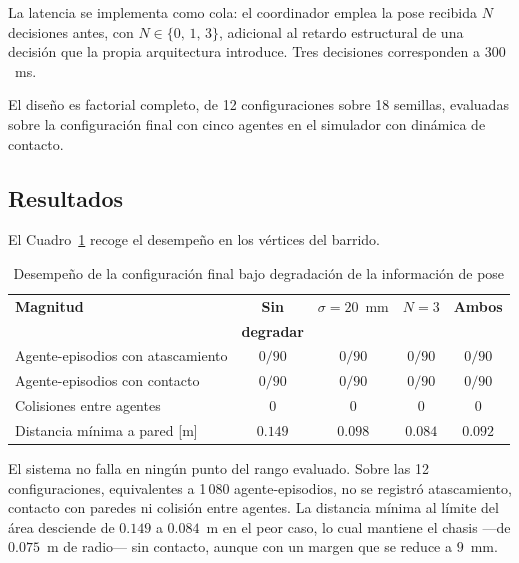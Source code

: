 La latencia se implementa como cola: el coordinador emplea la pose recibida
$N$ decisiones antes, con $N \in \{0,\, 1,\, 3\}$, adicional al retardo
estructural de una decisión que la propia arquitectura introduce. Tres
decisiones corresponden a $300$~ms.

El diseño es factorial completo, de 12 configuraciones sobre 18 semillas, evaluadas sobre la configuración final con cinco agentes en el
simulador con dinámica de contacto.

\subsection*{Resultados}

El Cuadro~\ref{tab:robustez} recoge el desempeño en los vértices del barrido.

\begin{table}[h]
    \centering\captionsetup{width=0.9\linewidth}
    \caption{Desempeño de la configuración final bajo degradación de la
             información de pose}
    \begin{tabular}{lcccc}
        \textbf{Magnitud} & \textbf{Sin} & $\sigma = 20$~mm &
        $N = 3$ & \textbf{Ambos} \\
        & \textbf{degradar} & & & \\
        \hline
        Agente-episodios con atascamiento & $0/90$ & $0/90$ & $0/90$
            & $0/90$ \\
        Agente-episodios con contacto & $0/90$ & $0/90$ & $0/90$ & $0/90$ \\
        Colisiones entre agentes & $0$ & $0$ & $0$ & $0$ \\
        Distancia mínima a pared [m] & $0{.}149$ & $0{.}098$ & $0{.}084$
            & $0{.}092$ \\
    \end{tabular}
    \label{tab:robustez}
\end{table}

El sistema no falla en ningún punto del rango evaluado. Sobre las 12 configuraciones, equivalentes a 1\,080 agente-episodios, no se registró
atascamiento, contacto con paredes ni colisión entre agentes. La distancia
mínima al límite del área desciende de $0{.}149$ a $0{.}084$~m en el peor caso,
lo cual mantiene el chasis —de $0{.}075$~m de radio— sin contacto, aunque con
un margen que se reduce a $9$~mm.

